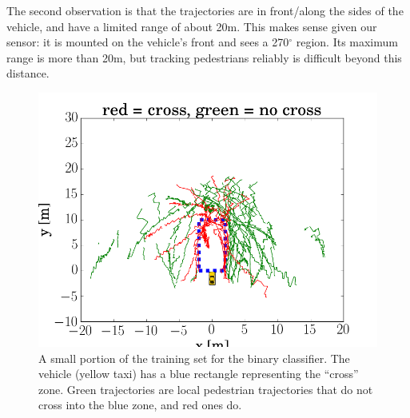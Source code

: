 The second observation is that the trajectories are in front/along the sides of the vehicle, and have a limited range of about 20m.
This makes sense given our sensor: it is mounted on the vehicle's front and sees a 270$^{\circ}$ region.
Its maximum range is more than 20m, but tracking pedestrians reliably is difficult beyond this distance.

\begin{figure}
	\centering
	\includegraphics [trim=0 0 0 0, clip, angle=0, width=0.8\columnwidth,
	keepaspectratio]{figures/training_set}
	\caption{A small portion of the training set for the binary classifier. The vehicle (yellow taxi) has a blue rectangle representing the ``cross'' zone. Green trajectories are local pedestrian trajectories that do not cross into the blue zone, and red ones do.} 
	\label{fig:training_set} 
\end{figure}



